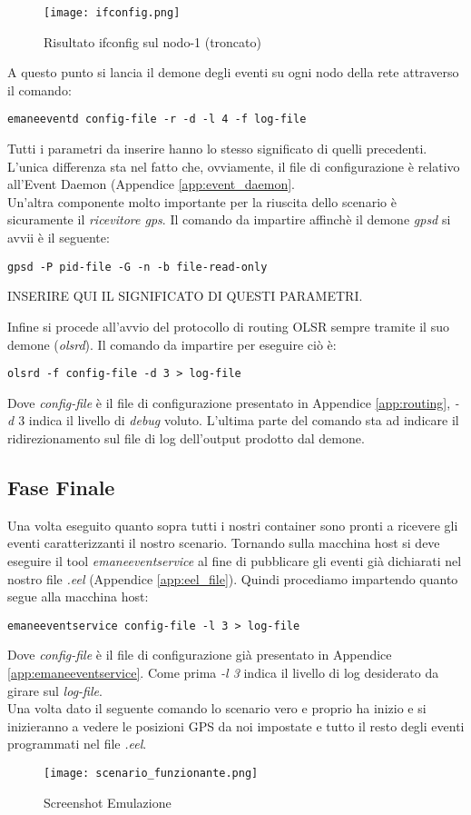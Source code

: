 \begin{figure}[H]
	\centering
	\texttt{[image: ifconfig.png]}
	\caption{Risultato ifconfig sul nodo-1 (troncato)}
	\label{fig:ifconfig}
\end{figure} 

A questo punto si lancia il demone degli eventi su ogni nodo della rete attraverso il comando:
\begin{verbatim}
emaneeventd config-file -r -d -l 4 -f log-file
\end{verbatim}
\noindent
Tutti i parametri da inserire hanno lo stesso significato di quelli precedenti. L'unica differenza sta nel fatto che, ovviamente, il file di configurazione è relativo all'Event Daemon (Appendice \ref{app:event_daemon}. \\

Un'altra componente molto importante per la riuscita dello scenario è sicuramente il \textit{ricevitore gps}. Il comando da impartire affinchè il demone \textit{gpsd} si avvii è il seguente:

\begin{verbatim}
gpsd -P pid-file -G -n -b file-read-only
\end{verbatim}
\noindent
INSERIRE QUI IL SIGNIFICATO DI QUESTI PARAMETRI.

Infine si procede all'avvio del protocollo di routing OLSR sempre tramite il suo demone (\textit{olsrd}). Il comando da impartire per eseguire ciò è:
\begin{verbatim}
olsrd -f config-file -d 3 > log-file
\end{verbatim}
\noindent
Dove \textit{config-file} è il file di configurazione presentato in Appendice \ref{app:routing}, \textit{-d $3$} indica il livello di \textit{debug} voluto. L'ultima parte del comando sta ad indicare il ridirezionamento sul file di log dell'output prodotto dal demone. \\

\subsection{Fase Finale}

Una volta eseguito quanto sopra tutti i nostri container sono pronti a ricevere gli eventi caratterizzanti il nostro scenario. Tornando sulla macchina host si deve eseguire il tool \textit{emaneeventservice} al fine di pubblicare gli eventi già dichiarati nel nostro file \textit{.eel} (Appendice \ref{app:eel_file}). Quindi procediamo impartendo quanto segue alla macchina host:
\begin{verbatim}
emaneeventservice config-file -l 3 > log-file
\end{verbatim}
\noindent
Dove \textit{config-file} è il file di configurazione già presentato in Appendice \ref{app:emaneeventservice}. Come prima \textit{-l 3} indica il livello di log desiderato da girare sul \textit{log-file}. \\
Una volta dato il seguente comando lo scenario vero e proprio ha inizio e si inizieranno a vedere le posizioni GPS da noi impostate e tutto il resto degli eventi programmati nel file \textit{.eel}.

\begin{figure}[H]
	\centering
	\texttt{[image: scenario\_funzionante.png]}
	\caption{Screenshot Emulazione}
	\label{fig:scenario_funzionante}
\end{figure} 
